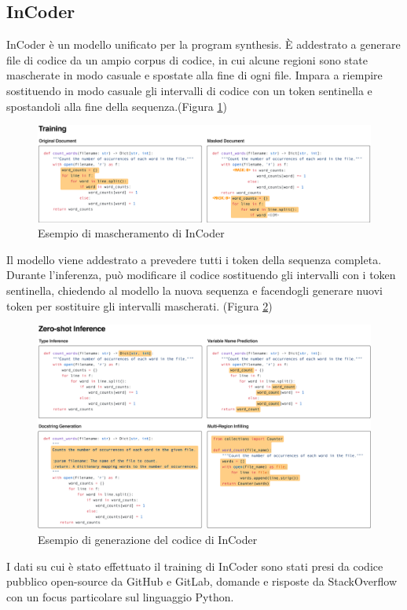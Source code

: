 \subsection{InCoder} \label{sssec:num1}
InCoder è un modello unificato per la program synthesis. 
È addestrato a generare file di codice da un ampio corpus di codice, in cui alcune regioni sono state mascherate in modo casuale e spostate alla fine di ogni file.
Impara a riempire sostituendo in modo casuale gli intervalli di codice con un token sentinella e spostandoli alla fine della sequenza.(Figura \ref{fig1_incoder})
\begin{figure}[h]
\centerline{\includegraphics[scale=.70]{immagini/incoder_fig1.png}}
\caption{Esempio di mascheramento di InCoder}
\label{fig1_incoder}
\end{figure}
Il modello viene addestrato a prevedere tutti i token della sequenza completa. Durante l'inferenza, può modificare il codice sostituendo gli intervalli con i token sentinella, chiedendo al modello la nuova sequenza e facendogli generare nuovi token per sostituire gli intervalli mascherati. (Figura \ref{fig2_incoder})
\begin{figure}[h!]
\centerline{\includegraphics[scale=.70]{immagini/incoder_fig2.png}}
\caption{Esempio di generazione del codice di InCoder}
\label{fig2_incoder}
\end{figure}
I dati su cui è stato effettuato il training di InCoder sono stati presi da codice pubblico open-source da GitHub e GitLab, domande e risposte da StackOverflow con un focus particolare sul linguaggio Python.


